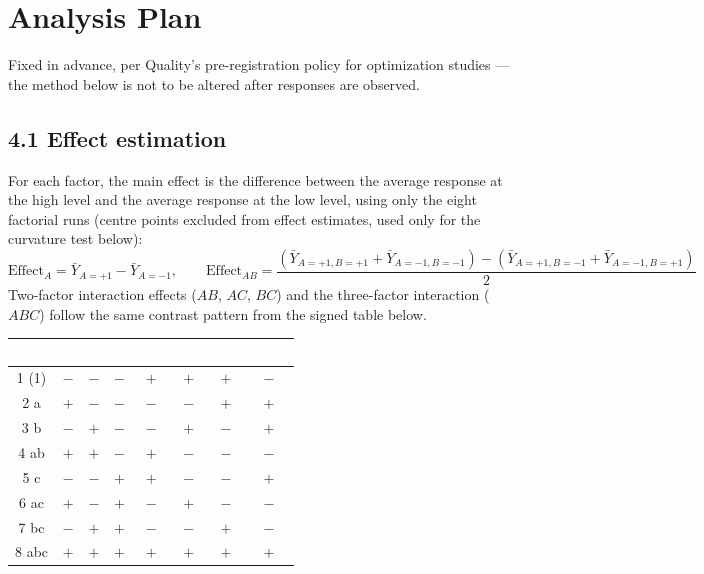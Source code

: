 \section{Analysis Plan}
Fixed in advance, per Quality's pre-registration policy for optimization studies --- the method
below is not to be altered after responses are observed.

\subsection*{4.1 Effect estimation}
For each factor, the main effect is the difference between the average response at the high
level and the average response at the low level, using only the eight factorial runs (centre
points excluded from effect estimates, used only for the curvature test below):
\[
  \text{Effect}_A = \bar{Y}_{A=+1} - \bar{Y}_{A=-1}, \qquad
  \text{Effect}_{AB} = \frac{(\bar{Y}_{A=+1,B=+1} + \bar{Y}_{A=-1,B=-1}) - (\bar{Y}_{A=+1,B=-1} + \bar{Y}_{A=-1,B=+1})}{2}
\]
Two-factor interaction effects (\(AB\), \(AC\), \(BC\)) and the three-factor interaction
(\(ABC\)) follow the same contrast pattern from the signed table below.

\vspace{0.3em}
\begin{center}
\footnotesize
\renewcommand{\arraystretch}{1.3}
\begin{tabular}{@{}c c c c c c c c@{}}
\toprule
\rowcolor{doeaccent}
\textcolor{white}{\textbf{Std}} & \textcolor{white}{\textbf{A}} & \textcolor{white}{\textbf{B}} &
\textcolor{white}{\textbf{C}} & \textcolor{white}{\textbf{AB}} & \textcolor{white}{\textbf{AC}} &
\textcolor{white}{\textbf{BC}} & \textcolor{white}{\textbf{ABC}} \\
\midrule
1 (1) & \(-\) & \(-\) & \(-\) & \(+\) & \(+\) & \(+\) & \(-\) \\
2 a   & \(+\) & \(-\) & \(-\) & \(-\) & \(-\) & \(+\) & \(+\) \\
3 b   & \(-\) & \(+\) & \(-\) & \(-\) & \(+\) & \(-\) & \(+\) \\
4 ab  & \(+\) & \(+\) & \(-\) & \(+\) & \(-\) & \(-\) & \(-\) \\
5 c   & \(-\) & \(-\) & \(+\) & \(+\) & \(-\) & \(-\) & \(+\) \\
6 ac  & \(+\) & \(-\) & \(+\) & \(-\) & \(+\) & \(-\) & \(-\) \\
7 bc  & \(-\) & \(+\) & \(+\) & \(-\) & \(-\) & \(+\) & \(-\) \\
8 abc & \(+\) & \(+\) & \(+\) & \(+\) & \(+\) & \(+\) & \(+\) \\
\bottomrule
\end{tabular}
\end{center}

